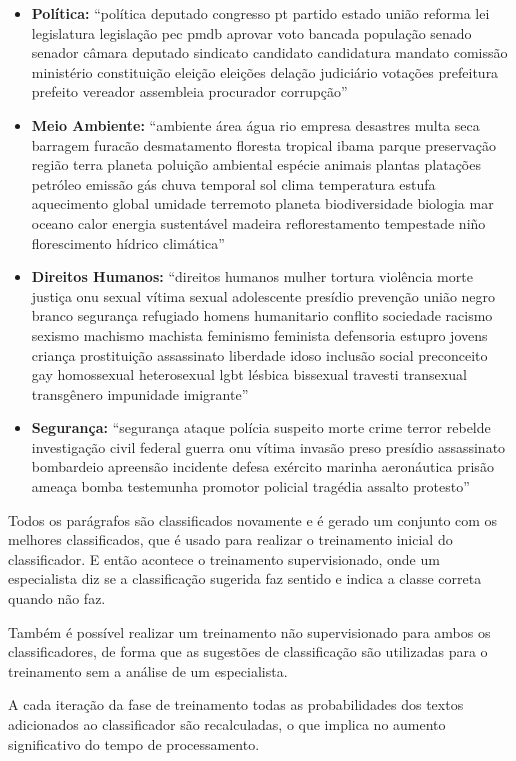 \begin{itemize}
    \item \textbf{Política:} ``política deputado congresso pt partido estado união reforma lei legislatura legislação pec pmdb aprovar voto bancada população senado senador câmara deputado sindicato candidato candidatura mandato comissão ministério constituição eleição eleições delação judiciário votações prefeitura prefeito vereador assembleia procurador corrupção''
    \item \textbf{Meio Ambiente:} ``ambiente área água rio empresa desastres multa seca barragem furacão desmatamento floresta tropical ibama parque preservação região terra planeta poluição ambiental espécie animais plantas platações petróleo emissão gás chuva temporal sol clima temperatura estufa aquecimento global umidade terremoto planeta biodiversidade biologia mar oceano calor energia sustentável madeira reflorestamento tempestade niño florescimento hídrico climática''
    \item \textbf{Direitos Humanos:} ``direitos humanos mulher tortura violência morte justiça onu sexual vítima sexual adolescente presídio prevenção união negro branco segurança refugiado homens humanitario conflito sociedade racismo sexismo machismo machista feminismo feminista defensoria estupro jovens criança prostituição assassinato liberdade idoso inclusão social preconceito gay homossexual heterosexual lgbt lésbica bissexual travesti transexual transgênero impunidade imigrante''
    \item \textbf{Segurança:} ``segurança ataque polícia suspeito morte crime terror rebelde investigação civil federal guerra onu vítima invasão preso presídio assassinato bombardeio apreensão incidente defesa exército marinha aeronáutica prisão ameaça bomba testemunha promotor policial tragédia assalto protesto''
\end{itemize}

Todos os parágrafos são classificados novamente e é gerado um conjunto com os melhores classificados, que é usado para realizar o treinamento inicial do classificador. E então acontece o treinamento supervisionado, onde um especialista diz se a classificação sugerida faz sentido e indica a classe correta quando não faz.

Também é possível realizar um treinamento não supervisionado para ambos os classificadores, de forma que as sugestões de classificação são utilizadas para o treinamento sem a análise de um especialista.

A cada iteração da fase de treinamento todas as probabilidades dos textos adicionados ao classificador são recalculadas, o que implica no aumento significativo do tempo de processamento.
